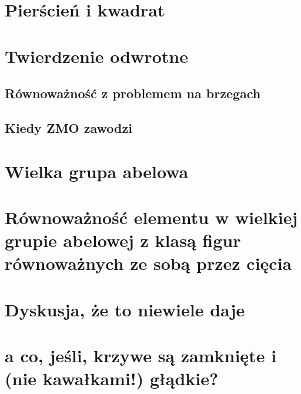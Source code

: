 \documentclass[a4paper, 12pt]{article}
\begin{document}
 \section{Pierścień i kwadrat}

\section{Twierdzenie odwrotne}

\subsection{Równoważność z problemem na brzegach}

\subsection{Kiedy ZMO zawodzi}

\section{Wielka grupa abelowa}

\section{Równoważność elementu w wielkiej grupie abelowej z klasą figur równoważnych ze sobą przez cięcia}

\section{Dyskusja, że to niewiele daje}

\section{a co, jeśli, krzywe są zamknięte i (nie kawałkami!) głądkie?}
\end{document}
